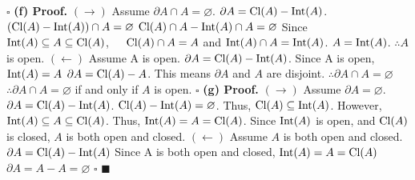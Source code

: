 \documentclass[12pt]{article}
\begin{document}
\newline \(\square\) \newline \newline
\textbf{(f) Proof.} \newline
\((\rightarrow)\) Assume \(\partial A \cap A = \varnothing\).
\newline
\(\partial A = \textup{Cl}(A) - \textup{Int}(A)\).
\newline
\((\textup{Cl}(A) - \textup{Int}(A))\cap A = \varnothing\)
\newline
\(\textup{Cl}(A)\cap A - \textup{Int}(A)\cap A = \varnothing\)
\newline
Since \(\textup{Int}(A) \subseteq A \subseteq \textup{Cl}(A)\),\ \ \
\(\textup{Cl}(A)\cap A = A\) and \(\textup{Int}(A)\cap A = \textup{Int}(A)\).
\newline
\(A = \textup{Int}(A)\).
\newline
\(\therefore A\) is open.
\newline \newline
\((\leftarrow)\) Assume A is open.
\newline
\(\partial A = \textup{Cl}(A) - \textup{Int}(A)\).
\newline
Since A is open, \(\textup{Int}(A) = A\)
\newline
\(\partial A = \textup{Cl}(A) - A\).
\newline
This means \(\partial A\) and \(A\) are disjoint.
\newline
\(\therefore \partial A \cap A = \varnothing\)
\newline \newline
\(\therefore \partial A \cap A = \varnothing\) if and only if \(A\) is open.
\newline \(\square\) \newline \newline
\textbf{(g) Proof.} \newline
\((\rightarrow)\) Assume \(\partial A = \varnothing\).
\newline
\(\partial A = \textup{Cl}(A) - \textup{Int}(A)\).
\newline
\(\textup{Cl}(A) - \textup{Int}(A) = \varnothing\).
\newline
Thus, \(\textup{Cl}(A) \subseteq \textup{Int}(A)\).
\newline
However, \(\textup{Int}(A) \subseteq A \subseteq \textup{Cl}(A)\).
\newline
Thus, \(\textup{Int}(A) = A = \textup{Cl}(A)\).
\newline
Since \(\textup{Int}(A)\) is open, and \(\textup{Cl}(A)\) is closed,
\newline
\(A\) is both open and closed.
\newline \newline
\((\leftarrow)\) Assume \(A\) is both open and closed.
\newline
\(\partial A = \textup{Cl}(A) - \textup{Int}(A)\)
\newline
Since A is both open and closed, \(\textup{Int}(A) = A = \textup{Cl}(A)\)
\newline
\(\partial A = A - A = \varnothing\)
\newline \(\square\) \newline \newline
\(\blacksquare\)
\end{document}
